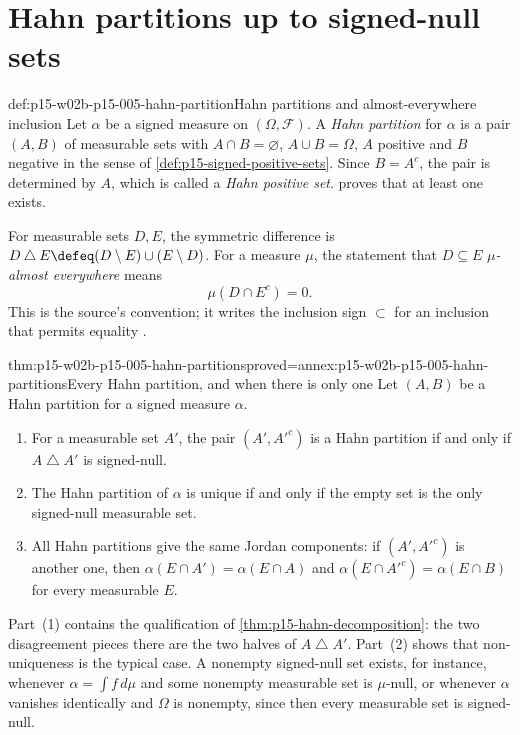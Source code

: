 \section{Hahn partitions up to signed-null sets}
\label{sec:p15-w02b-p15-005-hahn}

\begin{hbdefinition}{def:p15-w02b-p15-005-hahn-partition}{Hahn partitions and almost-everywhere inclusion}
Let \(\alpha\) be a signed measure on \((\Omega,\mathcal F)\).
A \emph{Hahn partition} for \(\alpha\) is a pair \((A,B)\) of
measurable sets with \(A\cap B=\varnothing\), \(A\cup B=\Omega\),
\(A\) positive and \(B\) negative in the sense of
\cref{def:p15-signed-positive-sets}. Since \(B=A^c\), the pair is
determined by \(A\), which is called a \emph{Hahn positive set}.
 proves that at least one exists.

For measurable sets \(D,E\), the symmetric difference is
\(D\mathbin{\triangle}E\defeq(D\setminus E)\cup(E\setminus D)\).
For a measure \(\mu\), the statement that \(D\subseteq E\)
\emph{\(\mu\)-almost everywhere} means
\[
                       \mu(D\cap E^c)=0 .
\]
This is the source's convention; it writes the inclusion sign
\(\subset\) for an inclusion that permits equality
\cite[p.~468]{DurrettPTEAuthor2019}.
\end{hbdefinition}

\begin{hbtheorem}{thm:p15-w02b-p15-005-hahn-partitions}{proved=annex:p15-w02b-p15-005-hahn-partitions}{Every Hahn partition, and when there is only one}
Let \((A,B)\) be a Hahn partition for a signed measure \(\alpha\).
\begin{enumerate}
\item For a measurable set \(A'\), the pair \((A',A'^c)\) is a Hahn
      partition if and only if \(A\mathbin{\triangle}A'\) is signed-null.
\item The Hahn partition of \(\alpha\) is unique if and only if the
      empty set is the only signed-null measurable set.
\item All Hahn partitions give the same Jordan components: if
      \((A',A'^c)\) is another one, then
      \(\alpha(E\cap A')=\alpha(E\cap A)\) and
      \(\alpha(E\cap A'^c)=\alpha(E\cap B)\) for every measurable \(E\).
\end{enumerate}
\end{hbtheorem}

Part~(1) contains the qualification of \cref{thm:p15-hahn-decomposition}:
the two disagreement pieces there are the two halves of
\(A\mathbin{\triangle}A'\). Part~(2) shows that non-uniqueness is the
typical case. A nonempty signed-null set exists, for instance, whenever
\(\alpha=\int f\,d\mu\) and some nonempty measurable set is
\(\mu\)-null, or whenever \(\alpha\) vanishes identically and \(\Omega\) is
nonempty, since then every measurable set is signed-null.

